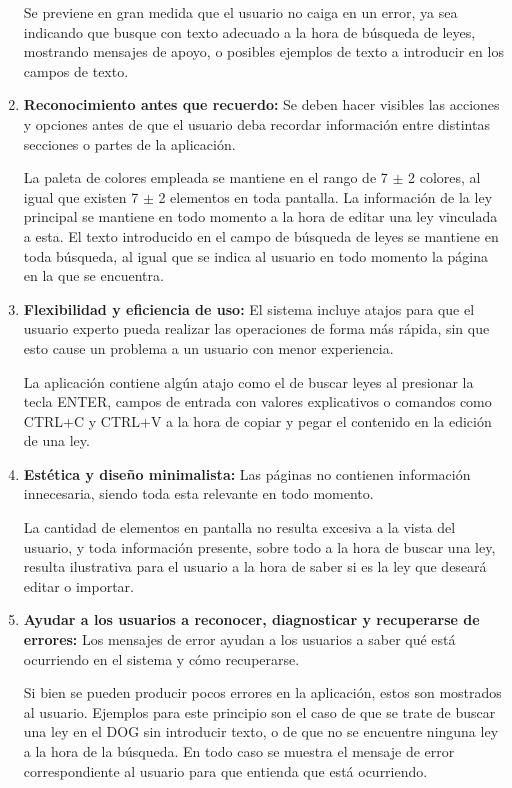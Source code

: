 \begin{enumerate}
    Se previene en gran medida que el usuario no caiga en un error, ya sea indicando que busque con texto adecuado a la hora de búsqueda de leyes, mostrando mensajes de apoyo, o posibles ejemplos de texto a introducir en los campos de texto.
    
    \item {\bf Reconocimiento antes que recuerdo:} Se deben hacer visibles las acciones y opciones antes de que el usuario deba recordar información entre distintas secciones o partes de la aplicación.
    
    
    La paleta de colores empleada se mantiene en el rango de 7 $\pm$ 2 colores, al igual que existen 7 $\pm$ 2 elementos en toda pantalla. La información de la ley principal se mantiene en todo momento a la hora de editar una ley vinculada a esta. El texto introducido en el campo de búsqueda de leyes se mantiene en toda búsqueda, al igual que se indica al usuario en todo momento la página en la que se encuentra.
    
    
    \item {\bf Flexibilidad y eficiencia de uso:} El sistema incluye atajos para que el usuario experto pueda realizar las operaciones de forma más rápida, sin que esto cause un problema a un usuario con menor experiencia.
    
    La aplicación contiene algún atajo como el de buscar leyes al presionar la tecla ENTER, campos de entrada con valores explicativos o comandos como CTRL+C y CTRL+V a la hora de copiar y pegar el contenido en la edición de una ley.
    
    
    \item {\bf Estética y diseño minimalista:} Las páginas no contienen información innecesaria, siendo toda esta relevante en todo momento.
    
    La cantidad de elementos en pantalla no resulta excesiva a la vista del usuario, y toda información presente, sobre todo a la hora de buscar una ley, resulta ilustrativa para el usuario a la hora de saber si es la ley que deseará editar o importar.
    
    
    \item {\bf Ayudar a los usuarios a reconocer, diagnosticar y recuperarse de errores:} Los mensajes de error ayudan a los usuarios a saber qué está ocurriendo en el sistema y cómo recuperarse.
    
    Si bien se pueden producir pocos errores en la aplicación, estos son mostrados al usuario. Ejemplos para este principio son el caso de que se trate de buscar una ley en el DOG sin introducir texto, o de que no se encuentre ninguna ley a la hora de la búsqueda. En todo caso se muestra el mensaje de error correspondiente al usuario para que entienda que está ocurriendo.
    

\end{enumerate}
